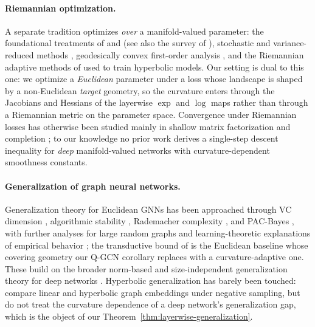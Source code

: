 \documentclass[letterpaper]{article}
\begin{document}
\paragraph{Riemannian optimization.}
A separate tradition optimizes \emph{over} a manifold-valued parameter:
the foundational treatments of \cite{absil2008optimization} and
\cite{boumal2023introduction} (see also the survey of
\cite{hu2020brief}), stochastic and variance-reduced methods
\cite{bonnabel2013stochastic, zhang2016riemannian, sato2019riemannian},
geodesically convex first-order analysis \cite{zhang2016first}, and the
Riemannian adaptive methods of \cite{bécigneul2019riemannianadaptiveoptimizationmethods} used to
train hyperbolic models. Our setting is dual to this one: we optimize a
\emph{Euclidean} parameter under a loss whose landscape is shaped by a
non-Euclidean \emph{target} geometry, so the curvature enters through the
Jacobians and Hessians of the layerwise $\exp$ and $\log$ maps rather than
through a Riemannian metric on the parameter space. Convergence under
Riemannian losses has otherwise been studied mainly in shallow matrix
factorization and completion
\cite{sun2016guaranteed}; to
our knowledge no prior work derives a single-step descent inequality for
\emph{deep} manifold-valued networks with curvature-dependent smoothness
constants.

\paragraph{Generalization of graph neural networks.}
Generalization theory for Euclidean GNNs has been approached through VC
dimension \cite{scarselli2018vapnik}, algorithmic stability
\cite{verma2019stability}, Rademacher complexity
\cite{garg2020generalization}, and PAC-Bayes
\cite{liao2020pac, ju2023generalization, sun2024pac}, with further
analyses for large random graphs \cite{maskey2022generalization} and
learning-theoretic explanations of empirical behavior
\cite{esser2021learning}; the transductive bound of \cite{tang2023towards}
is the Euclidean baseline whose covering geometry our Q-GCN corollary
replaces with a curvature-adaptive one. These build on the broader
norm-based and size-independent generalization theory for deep networks
\cite{bartlett2017spectrally, neyshabur2017pac, golowich2018size,
long2020generalizationboundsdeepconvolutional}. Hyperbolic generalization
has barely been touched: \cite{suzuki2021generalization} compare linear
and hyperbolic graph embeddings under negative sampling, but do not treat
the curvature dependence of a deep network's generalization gap, which is
the object of our Theorem~\ref{thm:layerwise-generalization}.
\end{document}
